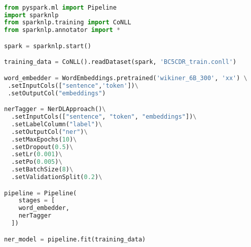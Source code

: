 \documentclass[a4paper,conference]{IEEEtran}
\begin{document}
\begin{lstlisting}[language=Python]

from pyspark.ml import Pipeline
import sparknlp
from sparknlp.training import CoNLL
from sparknlp.annotator import *

spark = sparknlp.start()

training_data = CoNLL().readDataset(spark, 'BC5CDR_train.conll')

word_embedder = WordEmbeddings.pretrained('wikiner_6B_300', 'xx') \
 .setInputCols(["sentence",'token'])\
 .setOutputCol("embeddings")

nerTagger = NerDLApproach()\
  .setInputCols(["sentence", "token", "embeddings"])\
  .setLabelColumn("label")\
  .setOutputCol("ner")\
  .setMaxEpochs(10)\
  .setDropout(0.5)\
  .setLr(0.001)\
  .setPo(0.005)\
  .setBatchSize(8)\
  .setValidationSplit(0.2)\

pipeline = Pipeline(
    stages = [
    word_embedder,
    nerTagger
  ])

ner_model = pipeline.fit(training_data)
\end{lstlisting}
\end{document}
